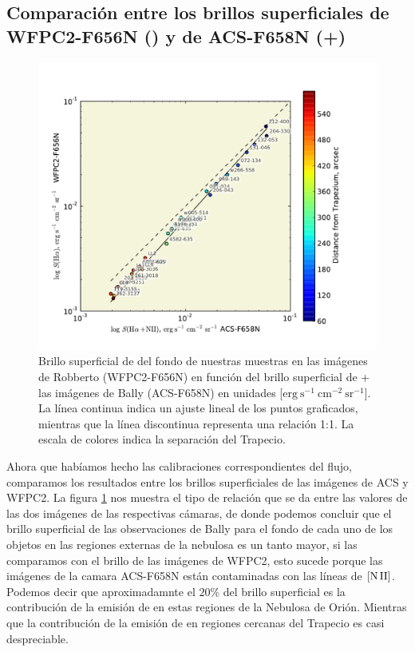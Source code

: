 \subsection{Comparación entre los brillos superficiales de WFPC2-F656N (\ha{}) y de ACS-F658N (\ha{}+\nii{})}
\label{sec:comp}

\begin{figure}
  \centering
   \includegraphics[width=0.9\linewidth, trim=20 20 30 50, clip]{luis-programas/S(alpha)_bg_WFPC2_ACS_calibrationlog-f.pdf}
  \caption{ Brillo superficial de \ha{} del fondo de nuestras muestras en las imágenes de Robberto (WFPC2-F656N) en función del brillo superficial de \ha{}+\nii{} las imágenes de Bally (ACS-F658N) en unidades  [\(\mathrm{erg\ s^{-1}\ cm^{-2}\ sr^{-1}}\)]. La línea continua indica un ajuste lineal de los puntos graficados, mientras que la línea discontinua representa una relación 1:1. La escala de colores indica la separación del Trapecio. }
  \label{fig:brillo-fisica}
\end{figure}

Ahora que habíamos hecho las calibraciones correspondientes del flujo, comparamos los resultados entre los brillos superficiales de las imágenes de ACS y WFPC2. La figura \ref{fig:brillo-fisica} nos muestra el tipo de relación que se da entre las valores de las dos imágenes de las respectivas cámaras, de donde podemos concluir que el brillo superficial de las observaciones de Bally para el fondo de cada uno de los objetos en las regiones externas de la nebulosa es un tanto mayor, si las comparamos con el brillo de las imágenes de WFPC2, esto sucede porque las imágenes de la camara ACS-F658N están contaminadas con las líneas de \(\mathrm{[N\,II]}{}\). Podemos decir que aproximadamnte el \(20\%\) del brillo superficial es la contribución de la emisión de \nii{} en estas regiones de la Nebulosa de Orión. Mientras que la contribución de la emisión de \nii{} en regiones cercanas del Trapecio es casi despreciable.\\

